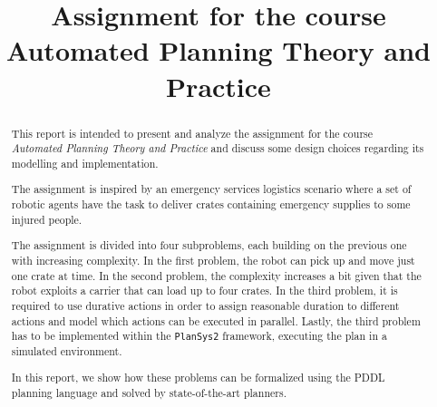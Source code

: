 \documentclass[conference]{IEEEtran}
\begin{document}
\title{Assignment for the course \\Automated Planning Theory and Practice\\
}

\author{
}

\maketitle

\begin{abstract}
This report is intended to present and analyze the assignment \cite{assignment} 
for the course \textit{Automated Planning Theory and Practice}
and discuss some design choices regarding its modelling and implementation.

The assignment is inspired by an emergency services logistics scenario where
a set of robotic agents have the task to deliver crates containing emergency 
supplies to some injured people.

The assignment is divided into four subproblems, each building on the previous 
one with increasing complexity.
In the first problem, the robot can pick up and move just one crate at time.
In the second problem, the complexity increases a bit given that the robot
exploits a carrier that can load up to four crates.
In the third problem, it is required to use durative actions in order to assign
reasonable duration to different actions and model which actions can be executed
in parallel.
Lastly, the third problem has to be implemented within the \texttt{PlanSys2} 
framework, executing the plan in a simulated environment.

In this report, we show how these problems can be formalized using the PDDL planning
language and solved by state-of-the-art planners.

\end{abstract}











% 
% 

\printbibliography %
\end{document}
